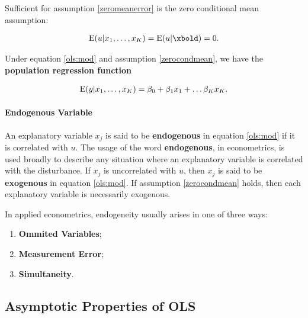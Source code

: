 \documentclass[11pt, oneside, a4paper, article]{article}
\numberwithin{equation}{section}
\begin{document}
Sufficient for assumption \eqref{zeromeanerror} is the zero conditional mean assumption:

\vspace{-1 em}
\begin{align} \label{zerocondmean}
	\E( u | x_{1}, \dots, x_{K} ) = \E( u | \xbold) = 0.
\end{align}

Under equation \eqref{ols:mod} and assumption \eqref{zerocondmean}, we have the \textbf{population regression function}

\vspace{-1 em}
\begin{align} \label{pop:regfun}
	\text{E}( y | x_{1}, \dots, x_{K} ) = \beta_{0} + \beta_{1} x_{1} + \dots \beta_{K} x_{K}. 
\end{align}

\paragraph{Endogenous Variable}

An explanatory variable $x_{j}$ is said to be \textbf{endogenous} in equation \eqref{ols:mod} if it is correlated with $u$.
The usage of the word \textbf{endogenous}, in econometrics, is used broadly to describe any situation where an explanatory variable is correlated with the disturbance.
If $x_{j}$ is uncorrelated with $u$, then $x_{j}$ is said to be \textbf{exogenous} in equation \eqref{ols:mod}.
If assumption \eqref{zerocondmean} holds, then each explanatory variable is necessarily exogenous.

In applied econometrics, endogeneity usually arises in one of three ways:

\vspace{-1 em}
\begin{enumerate}[noitemsep]
	\item \textbf{Ommited Variables};
	\item \textbf{Measurement Error};
	\item \textbf{Simultaneity}. 
\end{enumerate}

\subsection{Asymptotic Properties of OLS} 
\noindent
\citet[Sec. 4.2 -- Asymptotic Properties of OLS; p.51]{wool-2010}
\end{document}
